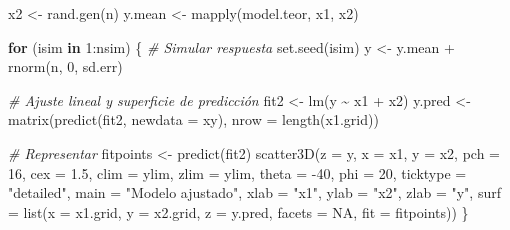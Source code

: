 \documentclass[
]{book}
\newenvironment{Shaded}{\begin{snugshade}}{\end{snugshade}}
\newcommand{\AttributeTok}[1]{\textcolor[rgb]{0.77,0.63,0.00}{#1}}
\newcommand{\CommentTok}[1]{\textcolor[rgb]{0.56,0.35,0.01}{\textit{#1}}}
\newcommand{\ConstantTok}[1]{\textcolor[rgb]{0.00,0.00,0.00}{#1}}
\newcommand{\ControlFlowTok}[1]{\textcolor[rgb]{0.13,0.29,0.53}{\textbf{#1}}}
\newcommand{\DecValTok}[1]{\textcolor[rgb]{0.00,0.00,0.81}{#1}}
\newcommand{\FloatTok}[1]{\textcolor[rgb]{0.00,0.00,0.81}{#1}}
\newcommand{\FunctionTok}[1]{\textcolor[rgb]{0.00,0.00,0.00}{#1}}
\newcommand{\NormalTok}[1]{#1}
\newcommand{\OtherTok}[1]{\textcolor[rgb]{0.56,0.35,0.01}{#1}}
\newcommand{\SpecialCharTok}[1]{\textcolor[rgb]{0.00,0.00,0.00}{#1}}
\newcommand{\StringTok}[1]{\textcolor[rgb]{0.31,0.60,0.02}{#1}}
\theoremstyle{break}
\theoremstyle{definition}
\theoremstyle{definition}
\theoremstyle{definition}
\theoremstyle{definition}
\theoremstyle{remark}
\begin{document}
\begin{Shaded}
\begin{Highlighting}[]
\NormalTok{x2 }\OtherTok{\textless{}{-}} \FunctionTok{rand.gen}\NormalTok{(n)}
\NormalTok{y.mean }\OtherTok{\textless{}{-}} \FunctionTok{mapply}\NormalTok{(model.teor, x1, x2)}

\ControlFlowTok{for}\NormalTok{ (isim }\ControlFlowTok{in} \DecValTok{1}\SpecialCharTok{:}\NormalTok{nsim) \{}
  \CommentTok{\# Simular respuesta}
  \FunctionTok{set.seed}\NormalTok{(isim)}
\NormalTok{  y }\OtherTok{\textless{}{-}}\NormalTok{ y.mean }\SpecialCharTok{+} \FunctionTok{rnorm}\NormalTok{(n, }\DecValTok{0}\NormalTok{, sd.err)}
  
  \CommentTok{\# Ajuste lineal y superficie de predicción}
\NormalTok{  fit2 }\OtherTok{\textless{}{-}} \FunctionTok{lm}\NormalTok{(y }\SpecialCharTok{\textasciitilde{}}\NormalTok{ x1 }\SpecialCharTok{+}\NormalTok{ x2)}
\NormalTok{  y.pred }\OtherTok{\textless{}{-}} \FunctionTok{matrix}\NormalTok{(}\FunctionTok{predict}\NormalTok{(fit2, }\AttributeTok{newdata =}\NormalTok{ xy), }\AttributeTok{nrow =} \FunctionTok{length}\NormalTok{(x1.grid)) }
  
  \CommentTok{\# Representar}
\NormalTok{  fitpoints }\OtherTok{\textless{}{-}} \FunctionTok{predict}\NormalTok{(fit2) }
  \FunctionTok{scatter3D}\NormalTok{(}\AttributeTok{z =}\NormalTok{ y, }\AttributeTok{x =}\NormalTok{ x1, }\AttributeTok{y =}\NormalTok{ x2, }\AttributeTok{pch =} \DecValTok{16}\NormalTok{, }\AttributeTok{cex =} \FloatTok{1.5}\NormalTok{, }\AttributeTok{clim =}\NormalTok{ ylim, }\AttributeTok{zlim =}\NormalTok{ ylim,}
            \AttributeTok{theta =} \SpecialCharTok{{-}}\DecValTok{40}\NormalTok{, }\AttributeTok{phi =} \DecValTok{20}\NormalTok{, }\AttributeTok{ticktype =} \StringTok{"detailed"}\NormalTok{, }
            \AttributeTok{main =} \StringTok{"Modelo ajustado"}\NormalTok{, }\AttributeTok{xlab =} \StringTok{"x1"}\NormalTok{, }\AttributeTok{ylab =} \StringTok{"x2"}\NormalTok{, }\AttributeTok{zlab =} \StringTok{"y"}\NormalTok{, }
            \AttributeTok{surf =} \FunctionTok{list}\NormalTok{(}\AttributeTok{x =}\NormalTok{ x1.grid, }\AttributeTok{y =}\NormalTok{ x2.grid, }\AttributeTok{z =}\NormalTok{ y.pred, }
                        \AttributeTok{facets =} \ConstantTok{NA}\NormalTok{, }\AttributeTok{fit =}\NormalTok{ fitpoints))}
\NormalTok{\}}
\end{Highlighting}
\end{Shaded}
\end{document}
